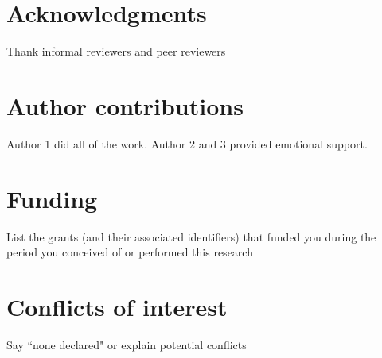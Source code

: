 \documentclass[10pt,letterpaper]{article}
\begin{document}
\section*{Acknowledgments}

Thank informal reviewers and peer reviewers

\section*{Author contributions}

Author 1 did all of the work. Author 2 and 3 provided emotional support.

\section*{Funding}

List the grants (and their associated identifiers) that funded you during the period you conceived of or performed this research

\section*{Conflicts of interest}

Say ``none declared" or explain potential conflicts

\nolinenumbers




\end{document}
